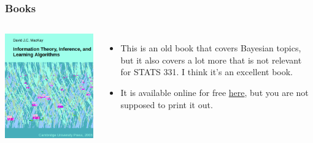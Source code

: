 \documentclass{beamer}
\begin{document}
\begin{frame}
\frametitle{Books}

    \begin{columns} %
        \includegraphics[width=0.8\linewidth]{images/itila.png}

        \begin{itemize}
        \item This is an old book that covers Bayesian topics, but it also
        covers a lot more that is not relevant for STATS 331. I think it's an
        excellent book.\pause
        \item It is available online for free
            \href{http://www.inference.org.uk/itprnn/book.pdf}{here}, but you
            are not supposed to print it out.
        \end{itemize}
     \end{columns}

\end{frame}
\end{document}

